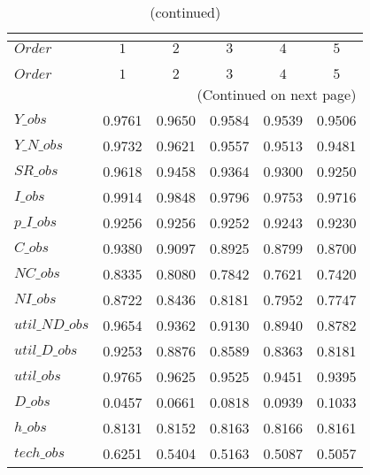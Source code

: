  
\begin{center}
\begin{longtable}{lccccc} 
\caption{COEFFICIENTS OF AUTOCORRELATION}\\
 \label{Table:th_autocorr_matrix}\\
\toprule 
$Order          $	 & 	 $         1$	 & 	 $         2$	 & 	 $         3$	 & 	 $         4$	 & 	 $         5$\\
\midrule \endfirsthead 
\caption{(continued)}\\
 \toprule \\ 
$Order          $	 & 	 $         1$	 & 	 $         2$	 & 	 $         3$	 & 	 $         4$	 & 	 $         5$\\
\midrule \endhead 
\midrule \multicolumn{6}{r}{(Continued on next page)} \\ \bottomrule \endfoot 
\bottomrule \endlastfoot 
$Y\_obs         $	 & 	    0.9761	 & 	    0.9650	 & 	    0.9584	 & 	    0.9539	 & 	    0.9506 \\ 
$Y\_N\_obs      $	 & 	    0.9732	 & 	    0.9621	 & 	    0.9557	 & 	    0.9513	 & 	    0.9481 \\ 
$SR\_obs        $	 & 	    0.9618	 & 	    0.9458	 & 	    0.9364	 & 	    0.9300	 & 	    0.9250 \\ 
$I\_obs         $	 & 	    0.9914	 & 	    0.9848	 & 	    0.9796	 & 	    0.9753	 & 	    0.9716 \\ 
$p\_I\_obs      $	 & 	    0.9256	 & 	    0.9256	 & 	    0.9252	 & 	    0.9243	 & 	    0.9230 \\ 
$C\_obs         $	 & 	    0.9380	 & 	    0.9097	 & 	    0.8925	 & 	    0.8799	 & 	    0.8700 \\ 
$NC\_obs        $	 & 	    0.8335	 & 	    0.8080	 & 	    0.7842	 & 	    0.7621	 & 	    0.7420 \\ 
$NI\_obs        $	 & 	    0.8722	 & 	    0.8436	 & 	    0.8181	 & 	    0.7952	 & 	    0.7747 \\ 
$util\_ND\_obs  $	 & 	    0.9654	 & 	    0.9362	 & 	    0.9130	 & 	    0.8940	 & 	    0.8782 \\ 
$util\_D\_obs   $	 & 	    0.9253	 & 	    0.8876	 & 	    0.8589	 & 	    0.8363	 & 	    0.8181 \\ 
$util\_obs      $	 & 	    0.9765	 & 	    0.9625	 & 	    0.9525	 & 	    0.9451	 & 	    0.9395 \\ 
$D\_obs         $	 & 	    0.0457	 & 	    0.0661	 & 	    0.0818	 & 	    0.0939	 & 	    0.1033 \\ 
$h\_obs         $	 & 	    0.8131	 & 	    0.8152	 & 	    0.8163	 & 	    0.8166	 & 	    0.8161 \\ 
$tech\_obs      $	 & 	    0.6251	 & 	    0.5404	 & 	    0.5163	 & 	    0.5087	 & 	    0.5057 \\ 
\end{longtable}
 \end{center}
